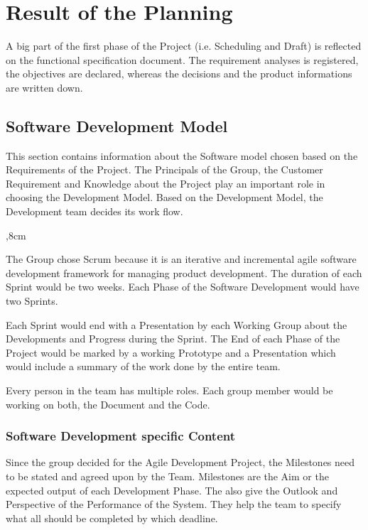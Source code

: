 \section{Result of the Planning}
A big part of the first phase of the Project (i.e. Scheduling and Draft) is reflected on the functional specification document. The requirement analyses is registered, the objectives are declared, whereas the decisions and the product informations are written down.

\subsection{Software Development Model}

This section contains information about the Software model chosen based on the Requirements of the Project.
The Principals of the Group, the Customer Requirement and Knowledge about the Project play an important role in choosing the Development Model. Based on the Development Model, the Development team decides its work flow. 

\begin{description}
	,8cm
	\item[Agile Development Model: SCRUM] The Group chose Scrum because it is an iterative and incremental agile software development framework for managing product development. The duration of each Sprint would be two weeks. Each Phase of the Software Development would have two Sprints. 
	
	Each Sprint would end with a Presentation by each Working Group about the Developments and Progress during the Sprint. The End of each Phase of the Project would be marked by a working Prototype and a Presentation which would include a summary of the work done by the entire team. 
	
	\item[Projects specific Adaptation to the Model:] Every person in the team has multiple roles. Each group member would be working on both, the Document and the Code.
\end{description} 

\subsubsection{Software Development specific Content}
Since the group decided for the Agile Development Project, the Milestones need to be stated and agreed upon by the Team. Milestones are the Aim or the expected output of each Development Phase. The also give the Outlook and Perspective of the Performance of the System. They help the team to specify what all should be completed by which deadline.

